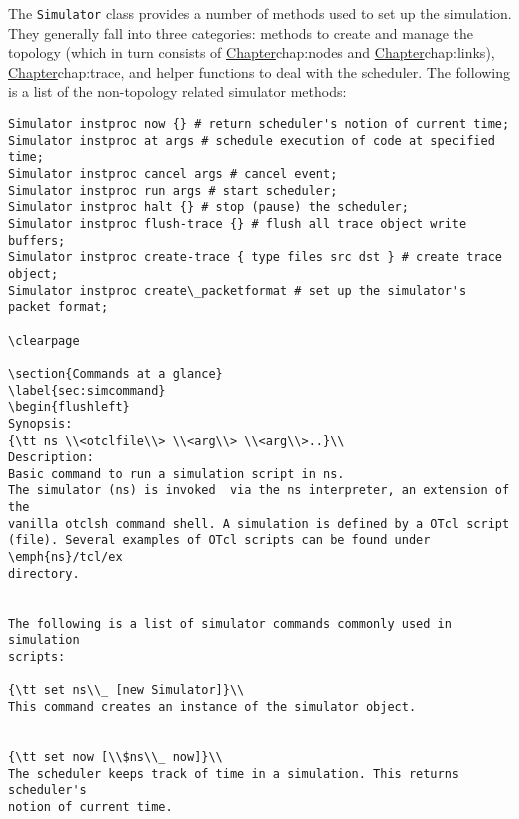 The {\tt Simulator} class provides a number of methods used
to set up the simulation.
They generally fall into three categories:
methods to create and manage the topology 
(which in turn consists of
\href{managing the nodes}{Chapter}{chap:nodes} and
\href{managing the links}{Chapter}{chap:links}),
\href{methods to perform tracing}{Chapter}{chap:trace},
and helper functions to deal with the scheduler.
The following is a list of the non-topology related simulator methods:
\begin{verbatim}
Simulator instproc now {} # return scheduler's notion of current time;
Simulator instproc at args # schedule execution of code at specified time;
Simulator instproc cancel args # cancel event;
Simulator instproc run args # start scheduler;
Simulator instproc halt {} # stop (pause) the scheduler;
Simulator instproc flush-trace {} # flush all trace object write buffers;
Simulator instproc create-trace { type files src dst } # create trace object;
Simulator instproc create\_packetformat # set up the simulator's packet format;

\clearpage

\section{Commands at a glance}
\label{sec:simcommand}
\begin{flushleft}
Synopsis:
{\tt ns \\<otclfile\\> \\<arg\\> \\<arg\\>..}\\
Description:
Basic command to run a simulation script in ns.
The simulator (ns) is invoked  via the ns interpreter, an extension of the
vanilla otclsh command shell. A simulation is defined by a OTcl script
(file). Several examples of OTcl scripts can be found under \emph{ns}/tcl/ex
directory.


The following is a list of simulator commands commonly used in simulation
scripts:

{\tt set ns\\_ [new Simulator]}\\
This command creates an instance of the simulator object.


{\tt set now [\\$ns\\_ now]}\\
The scheduler keeps track of time in a simulation. This returns scheduler's
notion of current time.



\end{verbatim}
